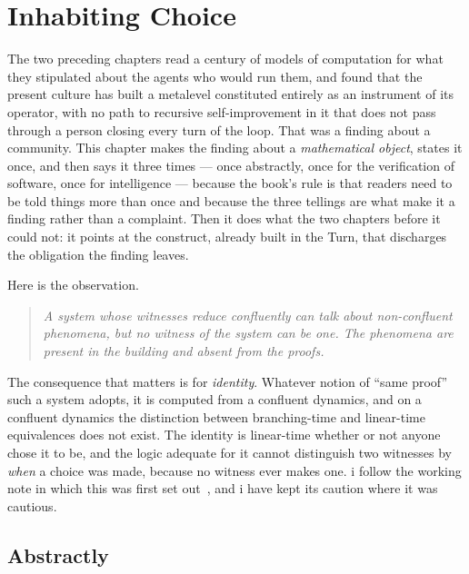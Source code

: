 \chapter{Inhabiting Choice}
\label{ch:inhabit}

The two preceding chapters read a century of models of computation
for what they stipulated about the agents who would run them, and
found that the present culture has built a metalevel constituted
entirely as an instrument of its operator, with no path to recursive
self-improvement in it that does not pass through a person closing
every turn of the loop.
That was a finding about a community.
This chapter makes the finding about a \emph{mathematical object},
states it once, and then says it three times --- once abstractly, once
for the verification of software, once for intelligence --- because
the book's rule is that readers need to be told things more than once
and because the three tellings are what make it a finding rather than a
complaint.
Then it does what the two chapters before it could not: it points at
the construct, already built in the Turn, that discharges the
obligation the finding leaves.

Here is the observation.

\begin{quote}
\itshape A system whose witnesses reduce confluently can talk about
non-confluent phenomena, but no witness of the system can be one.
The phenomena are present in the building and absent from the proofs.
\end{quote}

The consequence that matters is for \emph{identity}.
Whatever notion of ``same proof'' such a system adopts, it is computed
from a confluent dynamics, and on a confluent dynamics the distinction
between branching-time and linear-time equivalences does not exist.
The identity is linear-time whether or not anyone chose it to be, and
the logic adequate for it cannot distinguish two witnesses by
\emph{when} a choice was made, because no witness ever makes one.
i follow the working note in which this was first set
out~\cite{Inhabiting}, and i have kept its caution where it was
cautious.

\section{Abstractly}
\label{inh:sec:abstract}

